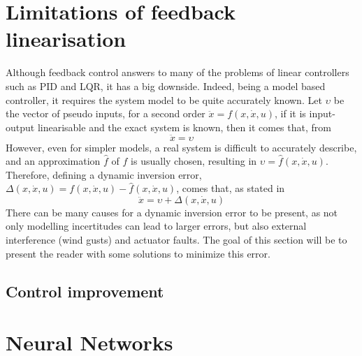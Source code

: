 \section{Limitations of feedback linearisation}
\label{section:background/limitations}
Although feedback control answers to many of the problems of linear controllers such as PID and LQR, it has a big downside. Indeed, being a model based controller, it requires the system model to be quite accurately known. Let $\upsilon$ be the vector of pseudo inputs, for a second order $\ddot{x} = f(x,\dot{x},u)$, if it is input-output linearisable and the exact system is known, then it comes that, from \cite{YANG+LIN_Adaptive_Flight_Control}
\begin{equation}
\ddot{x}=\upsilon
\end{equation}
However, even for simpler models, a real system is difficult to accurately describe, and an approximation $\hat{f}$ of $f$ is usually chosen, resulting in $\upsilon=\hat{f}(x,\dot{x},u)$. Therefore, defining a dynamic inversion error, $\Delta(x,\dot{x},u)=f(x,\dot{x},u)-\hat{f}(x,\dot{x},u)$, comes that, as stated in \cite{YANG+LIN_Adaptive_Flight_Control}
\begin{equation}
\ddot{x}=\upsilon + \Delta(x,\dot{x},u)
\end{equation}
There can be many causes for a dynamic inversion error to be present, as not only modelling incertitudes can lead to larger errors, but also external interference (wind gusts) and actuator faults. The goal of this section will be to present the reader with some solutions to minimize this error. 

\subsection{Control improvement}
\label{section:background/improvements}

\section{Neural Networks}
\label{section:background/NN}


